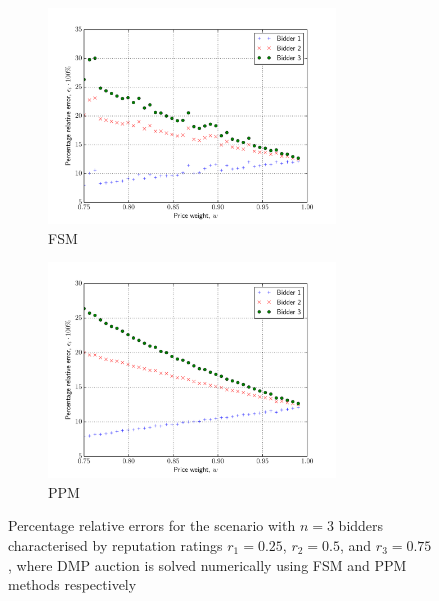 \begin{figure}[p!]
  \begin{subfigure}[b]{0.5\textwidth}
    \includegraphics[width=3in]{Approximation/Figures/compare_3_bidders_025_050_075}
    \caption{FSM}
    \label{fig:compare_3_bidders_025_050_075_fsm_approximation}
  \end{subfigure}
  \begin{subfigure}[b]{0.5\textwidth}
    \includegraphics[width=3in]{Approximation/Figures/compare_3_bidders_025_050_075_ppm}
    \caption{PPM}
    \label{fig:compare_3_bidders_025_050_075_ppm_approximation}
  \end{subfigure}
  \caption{Percentage relative errors for the scenario with $n=3$ bidders characterised by reputation ratings $r_1=0.25$, $r_2=0.5$, and $r_3=0.75$, where DMP auction is solved numerically using FSM and PPM methods respectively}
  \label{fig:compare_3_bidders_025_050_075_approximation}
\end{figure}

